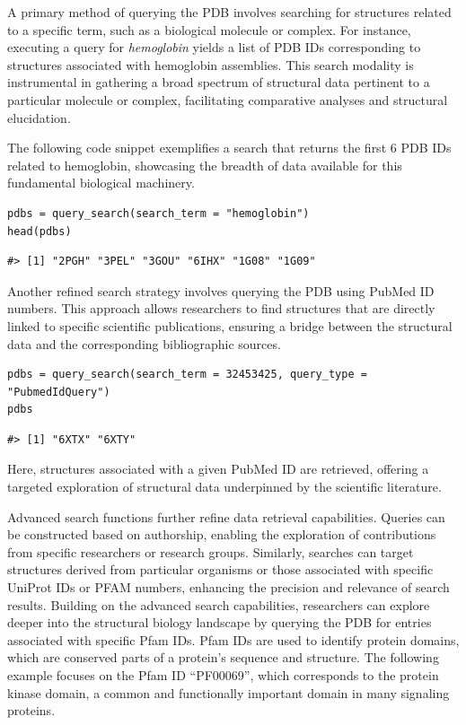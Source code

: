 A primary method of querying the PDB involves searching for structures related to a specific term, such as a biological molecule or complex. For instance, executing a query for \emph{hemoglobin} yields a list of PDB IDs corresponding to structures associated with hemoglobin assemblies. This search modality is instrumental in gathering a broad spectrum of structural data pertinent to a particular molecule or complex, facilitating comparative analyses and structural elucidation.

The following code snippet exemplifies a search that returns the first 6 PDB IDs related to hemoglobin, showcasing the breadth of data available for this fundamental biological machinery.

\begin{verbatim}
pdbs = query_search(search_term = "hemoglobin")
head(pdbs)
\end{verbatim}

\begin{verbatim}
#> [1] "2PGH" "3PEL" "3GOU" "6IHX" "1G08" "1G09"
\end{verbatim}

Another refined search strategy involves querying the PDB using PubMed ID numbers. This approach allows researchers to find structures that are directly linked to specific scientific publications, ensuring a bridge between the structural data and the corresponding bibliographic sources.

\begin{verbatim}
pdbs = query_search(search_term = 32453425, query_type = "PubmedIdQuery")
pdbs
\end{verbatim}

\begin{verbatim}
#> [1] "6XTX" "6XTY"
\end{verbatim}

Here, structures associated with a given PubMed ID are retrieved, offering a targeted exploration of structural data underpinned by the scientific literature.

Advanced search functions further refine data retrieval capabilities. Queries can be constructed based on authorship, enabling the exploration of contributions from specific researchers or research groups. Similarly, searches can target structures derived from particular organisms or those associated with specific UniProt IDs or PFAM numbers, enhancing the precision and relevance of search results. Building on the advanced search capabilities, researchers can explore deeper into the structural biology landscape by querying the PDB for entries associated with specific Pfam IDs. Pfam IDs are used to identify protein domains, which are conserved parts of a protein's sequence and structure. The following example focuses on the Pfam ID ``PF00069'', which corresponds to the protein kinase domain, a common and functionally important domain in many signaling proteins.


